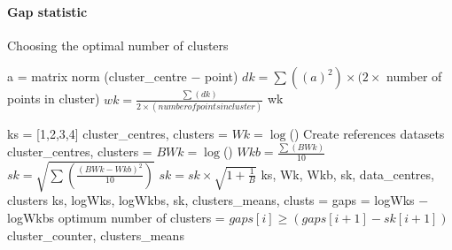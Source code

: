 \paragraph{Gap statistic}
\begin{algorithm}
\label{alg:GapStatistic}
\caption{Choosing the optimal number of clusters}
 \begin{algorithmic}[1]
    \Statex
    			\State a = matrix norm (cluster\_centre $-$ point)
    		\EndFor
    		\State $dk = \sum((a)^2 )\times (2 \times $ number of points in cluster)
    	\EndFor
    	\State $wk = \frac{ \sum(dk)}{2 \times (number of points in cluster)}$
    	\State \Return wk
    \EndFunction
    
    \Statex
    	 	\State ks = [1,2,3,4]
   			\State cluster\_centres, clusters = 
   			\State $Wk = \log$()   			
   			\State Create references datasets
			\State cluster\_centres, clusters =  
  			\State $BWk = \log$()
   			\EndFor   
   			\State $Wkb = \frac{\sum(BWk)}{10} $	
   			\State $sk = \sqrt{\sum(\frac{(BWk - Wkb)^2}{10})}$	
    	\EndFor
    \State $sk = sk \times \sqrt{1+\frac{1}{B}}$
    \State \Return ks, Wk, Wkb, sk, data\_centres, clusters
    \EndFunction
    \Statex
		    \State ks, logWks, logWkbs, sk, clusters\_means, clusts = 
		    \State gaps = logWks $-$ logWkbs
		    \State optimum number of clusters = $gaps[i] \geq (gaps[i+1]-sk[i+1])$
	\State \Return cluster\_counter, clusters\_means
	\EndFunction
  \end{algorithmic}
\end{algorithm}
\clearpage



